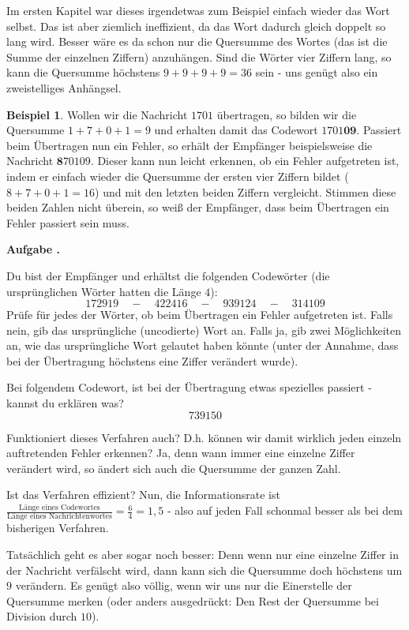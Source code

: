 \documentclass[a4paper,ngerman,12pt]{scrartcl}
\theoremstyle{definition}
\newtheorem{bsp}[defn]{Beispiel}
\theoremstyle{plain}
\theoremstyle{remark}
\newlength{\aufgabenskip}
\newcounter{aufgabennummer}
\newenvironment{aufgabe}[1]{
	\addtocounter{aufgabennummer}{1}
	\textbf{Aufgabe \theaufgabennummer.} \emph{#1} \par
}{\vspace{\aufgabenskip}}
\begin{document}
Im ersten Kapitel war dieses \glqq irgendetwas\grqq{} zum Beispiel einfach wieder das Wort selbst. Das ist aber ziemlich ineffizient, da das Wort dadurch gleich doppelt so lang wird. Besser wäre es da schon nur die Quersumme des Wortes (das ist die Summe der einzelnen Ziffern) anzuhängen. Sind die Wörter vier Ziffern lang, so kann die Quersumme höchstens $9+9+9+9=36$ sein - uns genügt also ein zweistelliges Anhängsel.

\begin{bsp}
	Wollen wir die Nachricht $1701$ übertragen, so bilden wir die Quersumme $1+7+0+1=9$ und erhalten damit das Codewort $1701\textbf{09}$. Passiert beim Übertragen nun ein Fehler, so erhält der Empfänger beispielsweise die Nachricht $\textbf{8}70109$. Dieser kann nun leicht erkennen, ob ein Fehler aufgetreten ist, indem er einfach wieder die Quersumme der ersten vier Ziffern bildet ($8+7+0+1=16$) und mit den letzten beiden Ziffern vergleicht. Stimmen diese beiden Zahlen nicht überein, so weiß der Empfänger, dass beim Übertragen ein Fehler passiert sein muss.
\end{bsp}

\begin{aufgabe}{}
	Du bist der Empfänger und erhältst die folgenden Codewörter (die ursprünglichen Wörter hatten die Länge $4$):
		\[172919 \quad-\quad 422416 \quad-\quad 939124  \quad-\quad 314109\]
	Prüfe für jedes der Wörter, ob beim Übertragen ein Fehler aufgetreten ist. Falls nein, gib das ursprüngliche (uncodierte) Wort an. Falls ja, gib zwei Möglichkeiten an, wie das ursprüngliche Wort gelautet haben könnte (unter der Annahme, dass bei der Übertragung höchstens eine Ziffer verändert wurde). 
	
	Bei folgendem Codewort, ist bei der Übertragung etwas spezielles passiert - kannst du erklären was?
		\[739150\]
\end{aufgabe}

Funktioniert dieses Verfahren auch? D.h. können wir damit wirklich jeden einzeln auftretenden Fehler erkennen? Ja, denn wann immer eine einzelne Ziffer verändert wird, so ändert sich auch die Quersumme der ganzen Zahl. 

Ist das Verfahren effizient? Nun, die Informationsrate ist $\frac{\text{Länge eines Codewortes}}{\text{Länge eines Nachrichtenwortes}} = \frac{6}{4} = 1,5$ - also auf jeden Fall schonmal besser als bei dem bisherigen Verfahren.

Tatsächlich geht es aber sogar noch besser: Denn wenn nur eine einzelne Ziffer in der Nachricht verfälscht wird, dann kann sich die Quersumme doch höchstens um $9$ verändern. Es genügt also völlig, wenn wir uns nur die Einerstelle der Quersumme merken (oder anders ausgedrückt: Den Rest der Quersumme bei Division durch $10$). 
\end{document}
